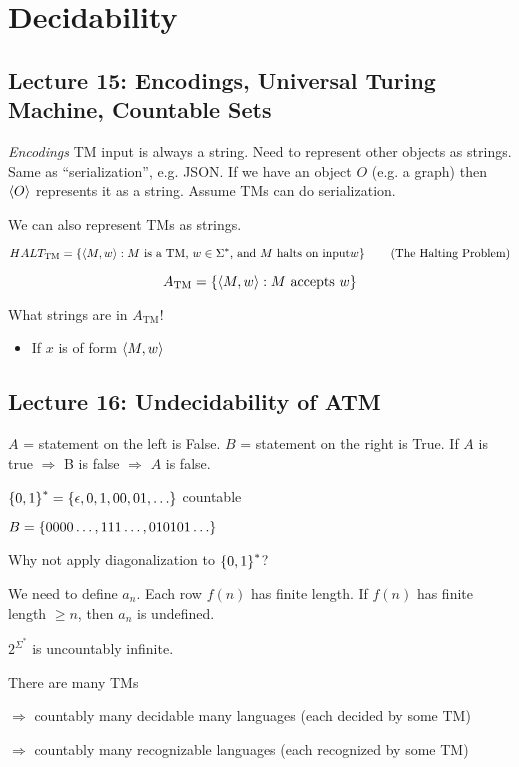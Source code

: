 \chapter{Decidability}

\section*{Lecture 15: Encodings, Universal Turing Machine, Countable Sets}

\emph{Encodings} \textsf{TM} input is always a string. Need to represent other objects as strings. Same as ``serialization'', e.g. JSON. If we have an object $O$ (e.g. a graph) then $\left \langle O \right \rangle$ represents it as a string. Assume TMs can do serialization.

We can also represent TMs as strings.

\begin{equation*}
    HALT_{\text{TM}} = \left \{ \left \langle M, w \right \rangle: M \text{ is a TM, } w \in \Sigma^* \text{, and } M \text{ halts on input} w \right \} \tag{The Halting Problem}
\end{equation*}

\begin{equation*}
    A_{\text{TM}} = \left \{ \left \langle M, w \right \rangle: M \text{ accepts } w \right \}
\end{equation*}

What strings are in $A_{\text{TM}}$!

\begin{itemize}
    \item If $x$ is of form $\left \langle M, w \right \rangle$
\end{itemize}

\section*{Lecture 16: Undecidability of ATM}

$A$ =  statement on the left is False. $B$ = statement on the right is True. If $A$ is true $\Rightarrow$ B is false $\Rightarrow$ $A$ is false.

$\left \{ 0, 1 \right \}^* = \left \{ \epsilon, 0, 1, 00, 01, \ldots \right \}$ countable

$B = \left \{ 0000\ldots, 111\ldots, 010101\ldots \right \}$

Why not apply diagonalization to $\left \{ 0, 1 \right \}^*$?

We need to define $a_n$. Each row $f(n)$ has finite length. If $f(n)$ has finite length $\geq n$, then $a_n$ is undefined.

$2^{\Sigma^*}$ is uncountably infinite.

There are many TMs

\begin{description}
    \item $\Rightarrow$ countably many decidable many languages (each decided by some TM)
    \item $\Rightarrow$ countably many recognizable languages (each recognized by some TM)
\end{description}
